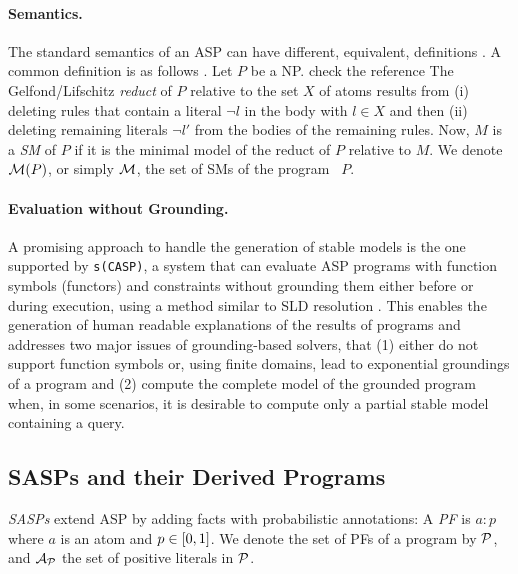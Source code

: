 \documentclass[a4paper]{article}
\renewcommand{\cite}{\citep}
\newcommand{\at}[1]{\ensuremath{\!\del{#1}}}        %
\newcommand{\cla}[1]{\ensuremath{{\cal #1}}}        %
\newcommand{\ATOMSset}{\ensuremath{\cla{A}}}
\newcommand{\PATOMset}{\ensuremath{\ATOMSset_{\cla{P}}}}
\newcommand{\PROBFset}{\ensuremath{\cla{P}}}
\newcommand{\MODELset}{\ensuremath{\cla{M}}}
\newcommand{\probfact}[2]{\ensuremath{#1:#2}}
\newcommand{\franc}[1]{{\color{green!30!black}#1}}
\begin{document}
\paragraph{Semantics.}

The standard semantics of an \ac{ASP} can have different, equivalent,
definitions \cite{lifschitz2008twelve}.  A common definition is as
follows \cite{gelfond1988stable}.  Let \(P\) be a \acl{NP}.
\franc{check the reference} The Gelfond/Lifschitz \emph{reduct} of
\(P\) relative to the set $X$ of atoms results from (i) deleting rules
that contain a literal \(\neg l\) in the body with \(l \in X\) and
then (ii) deleting remaining literals \(\neg l'\) from the bodies of
the remaining rules.  Now, \(M\) is a \textit{\acf{SM}} of \(P\) if it
is the minimal model of the reduct of \(P\) relative to \(M\).  We
denote \(\MODELset\at{P}\), or simply \(\MODELset\), the set of
\aclp{SM} of the program~ \(P\).


\paragraph{Evaluation without Grounding.}

A promising approach to handle the generation of stable models is the
one supported by \texttt{s(CASP)}, a system that can evaluate ASP
programs with function symbols (functors) and constraints without
grounding them either before or during execution, using a method
similar to SLD resolution
\cite{marple2017computing,arias2020justifications}.  This enables the
generation of human readable explanations of the results of programs
and addresses two major issues of grounding-based solvers, that %
   (1) either do not support function symbols or, using finite domains,
       lead to exponential groundings of a program and %
   (2) compute the complete model of the grounded program when, in some
       scenarios, it is desirable to compute only a partial stable model
       containing a query.
 

\subsection*{\acsp{SASP} and their Derived Programs}

\emph{\Acfp{SASP}} extend \ac{ASP} by adding facts with probabilistic
annotations: A \textit{\ac{PF}} is \(\probfact{a}{p}\) where \(a\) is
an atom and \(p\in\intcc{0,1}\).  We denote the set of \aclp{PF} of a
program by \(\PROBFset\), and \(\PATOMset\) the set of positive
literals in \(\PROBFset\).
\end{document}
